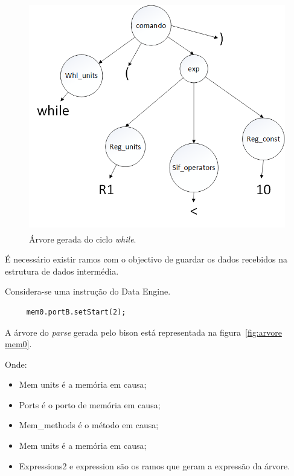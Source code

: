 \begin{figure}[!htb]
  \centering
  \includegraphics[height=100mm, width=130mm]{Figures/parse_do_ciclo_while.png}
  \caption[Árvore gerada do ciclo {\it while}.]{Árvore gerada do ciclo {\it while}.}  
  \label{fig:arvore while}
\end{figure}



É necessário existir ramos com o objectivo de guardar os dados recebidos na estrutura de dados intermédia.



Considera-se uma instrução do Data Engine.

\begin{lstlisting} 
     mem0.portB.setStart(2);   
\end{lstlisting}  

A árvore do {\it parse} gerada pelo bison está representada na figura~\ref{fig:arvore mem0}.

Onde:

\begin{itemize}
  \item Mem units é a memória em causa;
  \item Ports é o porto de memória em causa;
  \item Mem\_methods é o método em causa;
  \item Mem units é a memória em causa;
  \item Expressions2 e expression são os ramos que geram a expressão da árvore.
\end{itemize}



